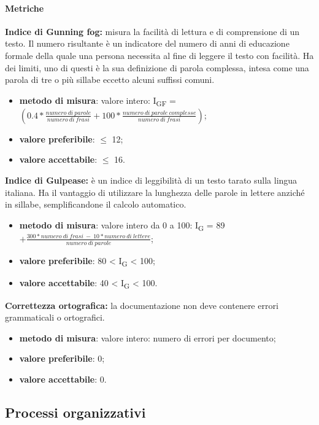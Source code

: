 \paragraph{Metriche}
\textbf{Indice di Gunning fog:} misura la facilità di lettura e di comprensione di un testo. Il numero risultante è un indicatore del numero di anni 
di educazione formale della quale una persona necessita al fine di leggere il testo con facilità.
Ha dei limiti, uno di questi è la sua definizione di parola complessa, intesa come una parola di
tre o più sillabe eccetto alcuni suffissi comuni.
\begin{itemize}
    \item \textbf{metodo di misura}: valore intero: I\textsubscript{GF} = $(0.4 *\frac{numero \ di \ parole}{numero \ di \ frasi} + 100 * \frac{numero \ di \ parole \ complesse}{numero \ di \ frasi})$;
    \item \textbf{valore preferibile}: $\leq$ 12;
    \item \textbf{valore accettabile}: $\leq$ 16.
\end{itemize}
\textbf{Indice di Gulpease:} è un indice di leggibilità di un testo tarato sulla lingua italiana. 
Ha il vantaggio di utilizzare la lunghezza delle parole in lettere anziché in sillabe, semplificandone il calcolo automatico. 
\begin{itemize}
    \item \textbf{metodo di misura}: valore intero da 0 a 100: I\textsubscript{G} = 89 $+ \frac{300*numero \ di \ frasi \ - \ 10*numero \ di \ lettere}{numero \ di \ parole}$;
    \item \textbf{valore preferibile}: 80 < I\textsubscript{G} < 100;
    \item \textbf{valore accettabile}: 40 < I\textsubscript{G} < 100.
\end{itemize}
\textbf{Correttezza ortografica:} la documentazione non deve contenere errori grammaticali o ortografici. 
\begin{itemize}
    \item \textbf{metodo di misura}: valore intero: numero di errori per documento;
    \item \textbf{valore preferibile}: 0;
    \item \textbf{valore accettabile}: 0.
\end{itemize}
\subsection{Processi organizzativi}
